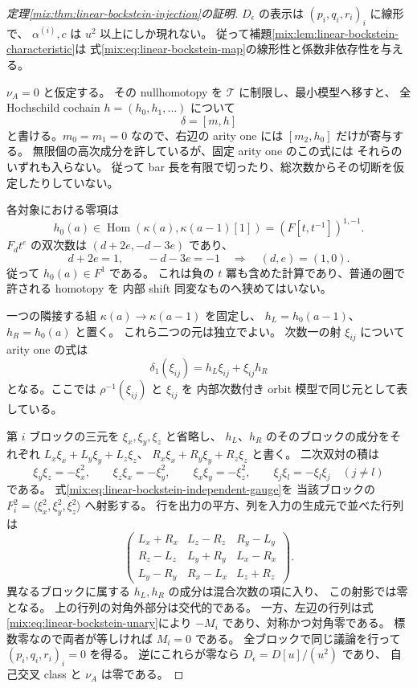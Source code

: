 \begin{proof}[定理\ref{mix:thm:linear-bockstein-injection}の証明]
$D_\epsilon$ の表示は $(p_i,q_i,r_i)_i$ に線形で、
$\alpha^{(i)},c$ は $u^2$ 以上にしか現れない。
従って補題\ref{mix:lem:linear-bockstein-characteristic}は
式\eqref{mix:eq:linear-bockstein-map}の線形性と係数非依存性を与える。

$\nu_A=0$ と仮定する。
その nullhomotopy を $\mathcal T$ に制限し、最小模型へ移すと、
全 Hochschild cochain $h=(h_0,h_1,\ldots)$ について
\[
                           \delta=[m,h]
\]
と書ける。$m_0=m_1=0$ なので、右辺の arity one には
$[m_2,h_0]$ だけが寄与する。
無限個の高次成分を許しているが、固定 arity one のこの式には
それらのいずれも入らない。
従って bar 長を有限で切ったり、総次数からその切断を仮定したりしていない。

各対象における零項は
\[
 h_0(a)\in
 \operatorname{Hom}(\kappa(a),\kappa(a-1)[1])
             =(F[t,t^{-1}])^{1,-1}.
\]
$F_d t^e$ の双次数は $(d+2e,-d-3e)$ であり、
\[
 d+2e=1,\qquad -d-3e=-1
               \quad\Longrightarrow\quad(d,e)=(1,0).
\]
従って $h_0(a)\in F^1$ である。
これは負の $t$ 冪も含めた計算であり、普通の圏で許される homotopy を
内部 shift 同変なものへ狭めてはいない。

一つの隣接する組
$\kappa(a)\to\kappa(a-1)$ を固定し、
$h_L=h_0(a-1)$、$h_R=h_0(a)$ と置く。
これら二つの元は独立でよい。
次数一の射 $\xi_{ij}$ について arity one の式は
\begin{equation}\label{mix:eq:linear-bockstein-independent-gauge}
       \delta_1(\xi_{ij})=h_L\xi_{ij}+\xi_{ij}h_R
\end{equation}
となる。ここでは $\rho^{-1}(\xi_{ij})$ と $\xi_{ij}$ を
内部次数付き orbit 模型で同じ元として表している。

第 $i$ ブロックの三元を $\xi_x,\xi_y,\xi_z$ と省略し、
$h_L$、$h_R$ のそのブロックの成分をそれぞれ
$L_x\xi_x+L_y\xi_y+L_z\xi_z$、
$R_x\xi_x+R_y\xi_y+R_z\xi_z$ と書く。
二次双対の積は
\[
 \xi_y\xi_z=-\xi_x^2,\qquad
 \xi_z\xi_x=-\xi_y^2,\qquad
 \xi_x\xi_y=-\xi_z^2,
 \qquad \xi_j\xi_l=-\xi_l\xi_j\quad(j\ne l)
\]
である。
式\eqref{mix:eq:linear-bockstein-independent-gauge}を
当該ブロックの $F_i^2=\langle\xi_x^2,\xi_y^2,\xi_z^2\rangle$ へ射影する。
行を出力の平方、列を入力の生成元で並べた行列は
\begin{equation}\label{mix:eq:linear-bockstein-gauge-matrix}
 \begin{pmatrix}
 L_x+R_x&L_z-R_z&R_y-L_y\\
 R_z-L_z&L_y+R_y&L_x-R_x\\
 L_y-R_y&R_x-L_x&L_z+R_z
 \end{pmatrix}.
\end{equation}
異なるブロックに属する $h_L,h_R$ の成分は混合次数の項に入り、
この射影では零となる。
上の行列の対角外部分は交代的である。
一方、左辺の行列は式\eqref{mix:eq:linear-bockstein-unary}により
$-M_i$ であり、対称かつ対角零である。
標数零なので両者が等しければ $M_i=0$ である。
全ブロックで同じ議論を行って $(p_i,q_i,r_i)_i=0$ を得る。
逆にこれらが零なら $D_\epsilon=D[u]/(u^2)$ であり、
自己交叉 class と $\nu_A$ は零である。
\end{proof}

